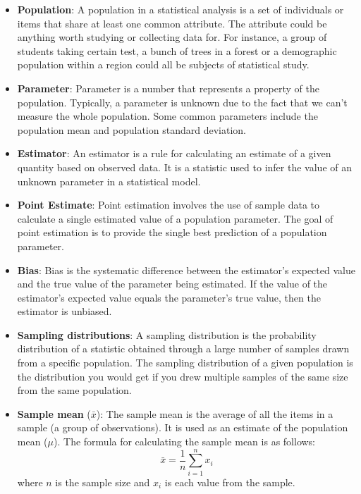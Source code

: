 \documentclass{article}
\begin{document}
\begin{itemize} 

\item \textbf{Population}: A population in a statistical analysis is a set of individuals or items that share at least one common attribute. The attribute could be anything worth studying or collecting data for. For instance, a group of students taking certain test, a bunch of trees in a forest or a demographic population within a region could all be subjects of statistical study.

\item \textbf{Parameter}: Parameter is a number that represents a property of the population. Typically, a parameter is unknown due to the fact that we can't measure the whole population. Some common parameters include the population mean and population standard deviation.

\item \textbf{Estimator}: An estimator is a rule for calculating an estimate of a given quantity based on observed data. It is a statistic used to infer the value of an unknown parameter in a statistical model.

\item \textbf{Point Estimate}: Point estimation involves the use of sample data to calculate a single estimated value of a population parameter. The goal of point estimation is to provide the single best prediction of a population parameter.

\item \textbf{Bias}: Bias is the systematic difference between the estimator's expected value and the true value of the parameter being estimated. If the value of the estimator's expected value equals the parameter's true value, then the estimator is unbiased.

\item \textbf{Sampling distributions}: A sampling distribution is the probability distribution of a statistic obtained through a large number of samples drawn from a specific population. The sampling distribution of a given population is the distribution you would get if you drew multiple samples of the same size from the same population.

\item \textbf{Sample mean} ($\bar{x}$): The sample mean is the average of all the items in a sample (a group of observations). It is used as an estimate of the population mean ($\mu$). The formula for calculating the sample mean is as follows: 
\[ \bar{x} = \frac{1}{n} \sum_{i=1}^n x_i \]  
where $n$ is the sample size and $x_i$ is each value from the sample.


\end{itemize}
\end{document}

